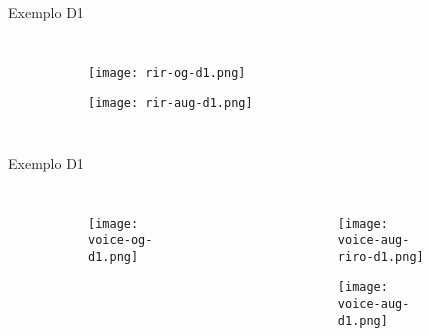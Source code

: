 \begin{frame}{Exemplo D1}
    \begin{columns}
        \begin{figure}
            \begin{subfigure}{\textwidth}
                \centering
                \texttt{[image: rir-og-d1.png]}
            \end{subfigure}
            \begin{subfigure}{\textwidth}
                \centering
                \texttt{[image: rir-aug-d1.png]}
            \end{subfigure}
        \end{figure}
    \end{columns}
        
\end{frame}

\begin{frame}{Exemplo D1}
    \begin{columns}
        \begin{figure}
            \begin{subfigure}{\textwidth}
                \centering
                \texttt{[image: voice-og-d1.png]}
            \end{subfigure}
        \end{figure}

        \begin{figure}
            \begin{subfigure}{\textwidth}
                \centering
                \texttt{[image: voice-aug-riro-d1.png]}
            \end{subfigure}
            \begin{subfigure}{\textwidth}
                \centering
                \texttt{[image: voice-aug-d1.png]}
            \end{subfigure}
        \end{figure}
    \end{columns}
\end{frame}

